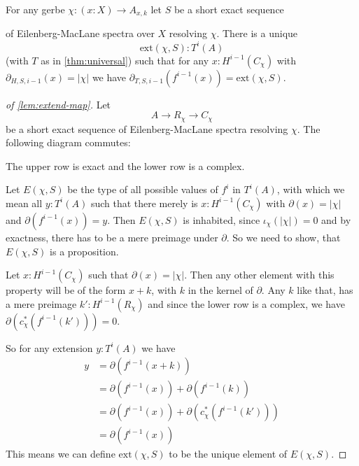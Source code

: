 \begin{lemma}
  \label{lem:extend-map}
  For any gerbe $\chi:(x:X)\to A_{x,k}$ let $S$ be a short exact sequence
  \begin{center}
  \end{center}
  of Eilenberg-MacLane spectra over $X$ resolving $\chi$.
  There is a unique
  \[\mathrm{ext}(\chi,S) : T^i(A)\]
  (with $T$ as in \cref{thm:universal}) such that for any $x:H^{i-1}(C_\chi)$ with $\partial_{H,S,i-1}(x)=|\chi|$ we have $\partial_{T,S,i-1}(f^{i-1}(x))=\mathrm{ext}(\chi,S)$.
\end{lemma}
\begin{proof}[of \cref{lem:extend-map}]
  Let
  \[ A \to R_\chi\to C_\chi\]
  be a short exact sequence of Eilenberg-MacLane spectra resolving $\chi$.
  The following diagram commutes:
  \begin{center}
  \end{center}
  The upper row is exact and the lower row is a complex.

  Let $E(\chi,S)$ be the type of all possible values of $f^i$ in $T^i(A)$,
  with which we mean all $y:T^i(A)$ such that there merely is $x:H^{i-1}(C_\chi)$ with $\partial(x)=|\chi|$
  and $\partial(f^{i-1}(x))=y$.
  Then $E(\chi,S)$ is inhabited, since $\iota_\chi(|\chi|)=0$ and by exactness, there has to be a mere preimage under $\partial$.
  So we need to show, that $E(\chi,S)$ is a proposition.
  
  Let $x:H^{i-1}(C_\chi)$ such that $\partial(x)=|\chi|$.
  Then any other element with this property will be of the form $x+k$, with $k$ in the kernel of $\partial$.
  Any $k$ like that, has a mere preimage $k':H^{i-1}(R_\chi)$ and since the lower row is a complex, we have $\partial(c_\chi^\ast(f^{i-1}(k')))=0$.
  
  So for any extension $y:T^{i}(A)$ we have
  \begin{align*}
    y &= \partial(f^{i-1}(x+k)) \\
      &= \partial(f^{i-1}(x))+\partial(f^{i-1}(k)) \\
      &= \partial(f^{i-1}(x))+\partial(c_\chi^\ast(f^{i-1}(k'))) \\
      &= \partial(f^{i-1}(x))
  \end{align*}
  This means we can define $\mathrm{ext}(\chi,S)$ to be the unique element of $E(\chi,S)$.
\end{proof}

